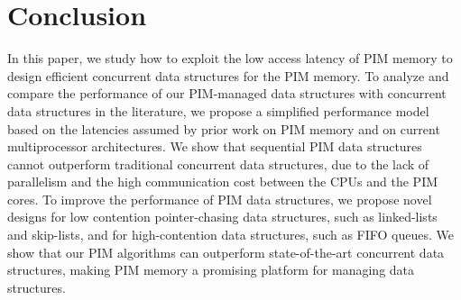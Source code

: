 \section{Conclusion}
\label{section:conclusion}
In this paper, we study how to exploit the low access latency 
of PIM memory to design efficient concurrent data structures for the PIM memory.
To analyze and compare the performance of our PIM-managed data structures with 
concurrent data structures in the literature, we propose a simplified 
performance model based on the latencies assumed by prior work on PIM
memory and on current multiprocessor architectures. 
We show that sequential PIM data structures cannot outperform traditional 
concurrent data structures, 
due to the lack of parallelism and the high communication cost between the CPUs and the PIM 
cores.  
To improve the performance of PIM data structures, we propose novel designs for    
low contention 
pointer-chasing data structures, such as linked-lists and skip-lists, and for high-contention  
data structures, such as FIFO queues. 
We show that our PIM algorithms can outperform state-of-the-art concurrent 
data structures, making PIM memory a promising platform for managing data structures.

 